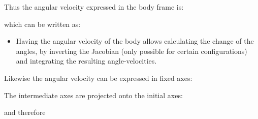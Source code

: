 \documentclass[10pt,a4paper]{scrartcl}
\begin{document}
\begin{multicols*}{2}

Thus the angular velocity expressed in the body frame is:

\mportant{$\vec{\omega}=\begin{bmatrix}
-\dot{\Psi}\sin\theta\cos\Phi+\dot{\theta}\sin\Phi\\
-\dot{\Psi}\sin\theta\sin\Phi+\dot{\theta}\cos\Phi\\
-\dot{\Phi}+\dot{\Psi}\cos\theta
\end{bmatrix}$}

which can be written as:


\begin{itemize}
\item Having the angular velocity of the body allows calculating the change of the angles, by inverting the Jacobian (only possible for certain configurations) and integrating the resulting angle-velocities.
\end{itemize}

Likewise the angular velocity can be expressed in fixed axes:


The intermediate axes are projected onto the initial axes:


and therefore


\end{multicols*}
\end{document}
